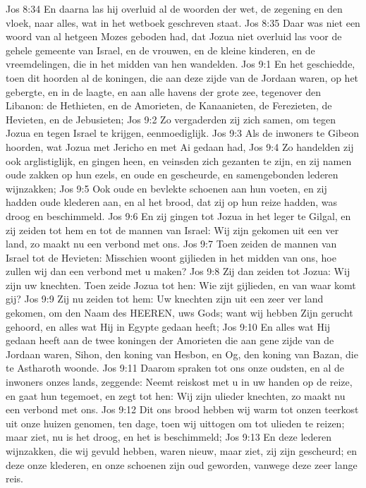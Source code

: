 Jos 8:34  En daarna las hij overluid al de woorden der wet, de zegening en den vloek, naar alles, wat in het wetboek geschreven staat.
Jos 8:35  Daar was niet een woord van al hetgeen Mozes geboden had, dat Jozua niet overluid las voor de gehele gemeente van Israel, en de vrouwen, en de kleine kinderen, en de vreemdelingen, die in het midden van hen wandelden.
Jos 9:1  En het geschiedde, toen dit hoorden al de koningen, die aan deze zijde van de Jordaan waren, op het gebergte, en in de laagte, en aan alle havens der grote zee, tegenover den Libanon: de Hethieten, en de Amorieten, de Kanaanieten, de Ferezieten, de Hevieten, en de Jebusieten;
Jos 9:2  Zo vergaderden zij zich samen, om tegen Jozua en tegen Israel te krijgen, eenmoediglijk.
Jos 9:3  Als de inwoners te Gibeon hoorden, wat Jozua met Jericho en met Ai gedaan had,
Jos 9:4  Zo handelden zij ook arglistiglijk, en gingen heen, en veinsden zich gezanten te zijn, en zij namen oude zakken op hun ezels, en oude en gescheurde, en samengebonden lederen wijnzakken;
Jos 9:5  Ook oude en bevlekte schoenen aan hun voeten, en zij hadden oude klederen aan, en al het brood, dat zij op hun reize hadden, was droog en beschimmeld.
Jos 9:6  En zij gingen tot Jozua in het leger te Gilgal, en zij zeiden tot hem en tot de mannen van Israel: Wij zijn gekomen uit een ver land, zo maakt nu een verbond met ons.
Jos 9:7  Toen zeiden de mannen van Israel tot de Hevieten: Misschien woont gijlieden in het midden van ons, hoe zullen wij dan een verbond met u maken?
Jos 9:8  Zij dan zeiden tot Jozua: Wij zijn uw knechten. Toen zeide Jozua tot hen: Wie zijt gijlieden, en van waar komt gij?
Jos 9:9  Zij nu zeiden tot hem: Uw knechten zijn uit een zeer ver land gekomen, om den Naam des HEEREN, uws Gods; want wij hebben Zijn gerucht gehoord, en alles wat Hij in Egypte gedaan heeft;
Jos 9:10  En alles wat Hij gedaan heeft aan de twee koningen der Amorieten die aan gene zijde van de Jordaan waren, Sihon, den koning van Hesbon, en Og, den koning van Bazan, die te Astharoth woonde.
Jos 9:11  Daarom spraken tot ons onze oudsten, en al de inwoners onzes lands, zeggende: Neemt reiskost met u in uw handen op de reize, en gaat hun tegemoet, en zegt tot hen: Wij zijn ulieder knechten, zo maakt nu een verbond met ons.
Jos 9:12  Dit ons brood hebben wij warm tot onzen teerkost uit onze huizen genomen, ten dage, toen wij uittogen om tot ulieden te reizen; maar ziet, nu is het droog, en het is beschimmeld;
Jos 9:13  En deze lederen wijnzakken, die wij gevuld hebben, waren nieuw, maar ziet, zij zijn gescheurd; en deze onze klederen, en onze schoenen zijn oud geworden, vanwege deze zeer lange reis.
